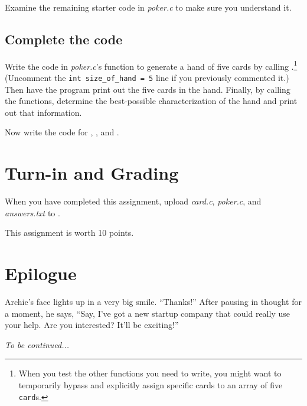 Examine the remaining starter code in \textit{poker.c} to make sure you
understand it.

\subsection{Complete the code}

Write the code in \textit{poker.c}'s  function to generate a
hand of five cards by calling .\footnote{When you test the
other functions you need to write, you might want to temporarily bypass
 and explicitly assign specific cards to an array of five
\lstinline{card}s.}  (Uncomment the \lstinline{int size_of_hand = 5} line if you
previously commented it.)  Then have the program print out the five cards in
the hand. Finally, by calling the  functions, determine the
best-possible characterization of the hand and print out that information.

Now write the code for , , and
.

\section{Turn-in and Grading}

When you have completed this assignment, upload \textit{card.c},
\textit{poker.c}, and \textit{answers.txt} to \filesubmission.

This assignment is worth 10 points.
\begin{description}
\item[Penalties]
\end{description}

\section*{Epilogue}

Archie's face lights up in a very big smile. ``Thanks!'' After pausing in
thought for a moment, he says, ``Say, I've got a new startup company that could
really use your help. Are you interested? It'll be exciting!''

\textit{To be continued...}


